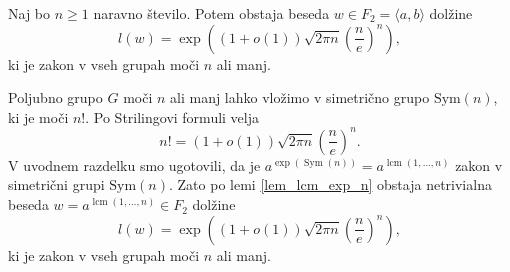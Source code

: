 \begin{posledica}
\label{psl_zakon_v_splosni_grupi_prastevilski}
Naj bo $n \ge 1$ naravno število. Potem obstaja beseda $w \in F_2 = \langle  a, b \rangle$ dolžine \begin{equation*}
    l(w) = \exp\left((1+ o(1)) \sqrt{2 \pi n} \left( \frac{n}{e} \right)^n\right),
\end{equation*}
ki je zakon v vseh grupah moči $n$ ali manj. 
\end{posledica}
\begin{dokaz}
Poljubno grupo $G$ moči $n$ ali manj lahko vložimo v simetrično grupo $\text{Sym}(n)$, ki je moči $n!$. Po Strilingovi formuli velja \begin{equation*}
    n! =  (1+ o(1)) \sqrt{2 \pi n} \left( \frac{n}{e} \right)^n.
\end{equation*}  
V uvodnem razdelku smo ugotovili, da je $a^{\exp(\operatorname{Sym}(n))} = a^{\operatorname{lcm}(1, \ldots, n)}$ zakon v simetrični grupi $\text{Sym}(n)$.
Zato po lemi \ref{lem_lcm_exp_n} obstaja netrivialna beseda $w = a^{\operatorname{lcm}(1, \ldots, n)} \in F_2$ dolžine
\begin{equation*}
l(w) = \exp\left((1+ o(1)) \sqrt{2 \pi n} \left( \frac{n}{e} \right)^n\right),
\end{equation*}  
  ki je zakon v vseh grupah moči $n$ ali manj. 
\end{dokaz}





